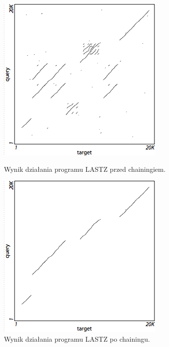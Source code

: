 \documentclass[a4paper, 12pt]{article}
\begin{document}
\begin{figure}[H]
    \centering
    \begin{minipage}{0.49\textwidth}
        \centering
        \includegraphics[width=\textwidth]{img/before_chaining.png}
        \caption{Wynik działania programu LASTZ przed chainingiem.}
        \label{fig:before_chaining}
    \end{minipage}
    \hfill
    \begin{minipage}{0.49\textwidth}
        \centering
        \includegraphics[width=\textwidth]{img/after_chaining.png}
        \caption{Wynik działania programu LASTZ po chainingu.}
        \label{fig:after_chaining}
    \end{minipage}
\end{figure}
\end{document}
